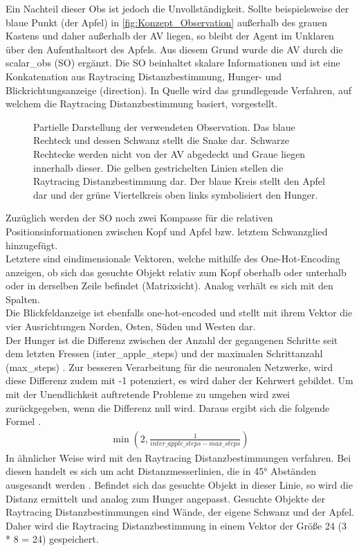 Ein Nachteil dieser Obs ist jedoch die Unvollständigkeit. Sollte beispielsweise der blaue Punkt (der Apfel) in \autoref{fig:Konzept_Observation} außerhalb des grauen Kastens und daher außerhalb der AV liegen, so bleibt der Agent im Unklaren über den Aufenthaltsort des Apfels.
Aus diesem Grund wurde die AV durch die scalar\_obs (SO) ergänzt. Die SO beinhaltet skalare Informationen und ist eine Konkatenation aus Raytracing Distanzbestimmung, Hunger- und Blickrichtungsanzeige (direction).
In Quelle \citep{Glassner1989} wird das grundlegende Verfahren, auf welchem die Raytracing Distanzbestimmung basiert, vorgestellt. 
\begin{figure}[H]
	\centering
	
	\caption[Observation]{Partielle Darstellung der verwendeten Observation. Das blaue Rechteck und dessen Schwanz stellt die Snake dar. Schwarze Rechtecke werden nicht von der AV abgedeckt und Graue liegen innerhalb dieser. Die gelben gestrichelten Linien stellen die Raytracing Distanzbestimmung dar. Der blaue Kreis stellt den Apfel dar und der grüne Viertelkreis oben links symbolisiert den Hunger.}
	\label{fig:Konzept_Observation}
\end{figure}
Zuzüglich werden der SO noch zwei Kompasse für die relativen Positionsinformationen zwischen Kopf und Apfel bzw. letztem Schwanzglied hinzugefügt.\\
Letztere sind eindimensionale Vektoren, welche mithilfe des One-Hot-Encoding anzeigen, ob sich das gesuchte Objekt relativ zum Kopf oberhalb oder unterhalb oder in derselben Zeile befindet (Matrixsicht). Analog verhält es sich mit den Spalten.\\
Die Blickfeldanzeige ist ebenfalls one-hot-encoded und stellt mit ihrem Vektor die vier Ausrichtungen Norden, Osten, Süden und Westen dar.\\
Der Hunger ist die Differenz zwischen der Anzahl der gegangenen Schritte seit dem letzten Fressen (inter\_apple\_steps) und der maximalen Schrittanzahl (max\_steps) . Zur besseren Verarbeitung für die neuronalen Netzwerke, wird diese Differenz zudem mit -1 potenziert, es wird daher der Kehrwert gebildet. 
Um mit der Unendlichkeit auftretende Probleme zu umgehen wird zwei zurückgegeben, wenn die Differenz null wird.
Daraus ergibt sich die folgende Formel .
\begin{align}
	\min(2, \frac{1}{inter\_apple\_steps - max\_steps})
	\label{eq:Konzept_Hunger}
\end{align}
In ähnlicher Weise wird mit den Raytracing Distanzbestimmungen verfahren. Bei diesen handelt es sich um acht Distanzmesserlinien, die in 45° Abständen ausgesandt werden . Befindet sich das gesuchte Objekt in dieser Linie, so wird die Distanz ermittelt und analog zum Hunger angepasst. Gesuchte Objekte der Raytracing Distanzbestimmungen sind Wände, der eigene Schwanz und der Apfel. Daher wird die Raytracing Distanzbestimmung in einem Vektor der Größe 24 (3 * 8 = 24) gespeichert.

